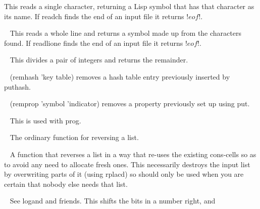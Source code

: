 \begin{description}
This reads a single character, returning a Lisp symbol that has that character
as its name. If {\tx readch} finds the end of an input file it returns {\tx !$eof!$}.
\item[{\tx readline~~~~~} \hspace{1cm} {\em function 0 args}]~\newline
This reads a whole line and returns a symbol made up from the characters
found. If {\tx readlione} finds the end of an input file it returns
{\tx !$eof!$}.
\item[{\tx remainder~~~~} \hspace{1cm} {\em function 2 args}]~\newline
This divides a pair of integers and returns the remainder.
\item[{\tx remhash~~~~~~} \hspace{1cm} {\em function 2 args}]~\newline
{\tx (remhash 'key table)} removes a hash table entry previously
inserted by {\tx puthash}.
\item[{\tx remprop~~~~~~} \hspace{1cm} {\em function 2 args}]~\newline
{\tx (remprop 'symbol 'indicator)} removes a property previously
set up using {\tx put}.
\item[{\tx return~~~~~~~} \hspace{1cm} {\em function 1 arg}]~\newline
This is used with {\tx prog}.
\item[{\tx reverse~~~~~~} \hspace{1cm} {\em function 1 arg}]~\newline
The ordinary function for reversing a list.
\item[{\tx reversip~~~~~} \hspace{1cm} {\em function 1 arg}]~\newline
A function that reverses a list in a way that re-uses the existing {\tx cons}-cells
so as to avoid any need to allocate fresh ones. This necessarily destroys
the input list by overwriting parts of it (using {\tx rplacd})
so should only be used when you are certain that nobody else needs that list.
\item[{\tx rightshift~~~} \hspace{1cm} {\em function 2 args}]~\newline
See {\tx logand} and friends. This shifts the bits in a number right, and

\end{description}
